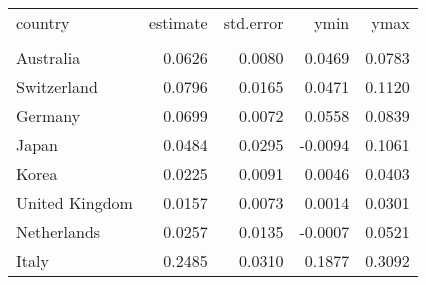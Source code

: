 \begin{tabular}{lrrrr}
   \toprule 
 
country & estimate & std.error & ymin & ymax \\ 

\cmidrule(lr){1-5} 
 
\\[-1.8ex]  
 
Australia & 0.0626 & 0.0080 & 0.0469 & 0.0783 \\ 
  Switzerland & 0.0796 & 0.0165 & 0.0471 & 0.1120 \\ 
  Germany & 0.0699 & 0.0072 & 0.0558 & 0.0839 \\ 
  Japan & 0.0484 & 0.0295 & -0.0094 & 0.1061 \\ 
  Korea & 0.0225 & 0.0091 & 0.0046 & 0.0403 \\ 
  United Kingdom & 0.0157 & 0.0073 & 0.0014 & 0.0301 \\ 
  Netherlands & 0.0257 & 0.0135 & -0.0007 & 0.0521 \\ 
  Italy & 0.2485 & 0.0310 & 0.1877 & 0.3092 \\ 
   \bottomrule  
\end{tabular}
